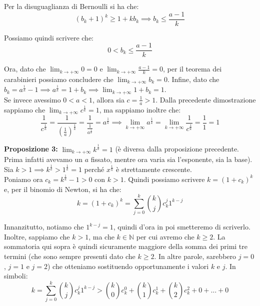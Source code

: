 \documentclass{article}
\begin{document}
\noindent Per la disuguaglianza di Bernoulli si ha che:
\begin{equation*}
    (b_k + 1)^k \geq 1 + kb_k \implies b_k \leq \frac{a - 1}{k}
\end{equation*}

\noindent Possiamo quindi scrivere che:
\begin{equation*}
    0 < b_k \leq \frac{a - 1}{k}
\end{equation*}

\noindent Ora, dato che $\lim_{k \to +\infty} 0 = 0$ e $\lim_{k \to +\infty} \frac{a - 1}{k} = 0$, per il teorema dei carabinieri possiamo concludere che $\lim_{k \to +\infty} b_k = 0$. Infine, dato che $b_k = a^\frac{1}{k} - 1 \implies a^\frac{1}{k} = 1 + b_k \implies \lim_{k \to +\infty} 1 + b_k = 1$.\\
Se invece avessimo $0 < a < 1$, allora sia $c = \frac{1}{a} > 1$. Dalla precedente dimostrazione sappiamo che $\lim_{k \to +\infty} c^\frac{1}{k} = 1$, ma sappiamo inoltre che:
\begin{equation*}
    \frac{1}{c^\frac{1}{k}} = \frac{1}{(\frac{1}{a})^\frac{1}{k}} = \frac{1}{\frac{1}{a^\frac{1}{k}}} = a^\frac{1}{k} \implies \lim_{k \to +\infty} a^\frac{1}{k} = \lim_{k \to +\infty} \frac{1}{c^\frac{1}{k}} = \frac{1}{1} = 1
\end{equation*}

\noindent\textbf{Proposizione 3:} $\lim_{k \to +\infty} k^\frac{1}{k} = 1$ (è diversa dalla proposizione precedente. Prima infatti avevamo un $a$ fissato, mentre ora varia sia l'esponente, sia la base).\\
Sia $k > 1 \implies k^\frac{1}{k} > 1^\frac{1}{k} = 1$ perché $x^\frac{1}{k}$ è strettamente crescente.\\
Poniamo ora $c_k = k^\frac{1}{k} - 1 > 0$ con $k > 1$. Quindi possiamo scrivere $k = (1 + c_k)^k$ e, per il binomio di Newton, si ha che:
\begin{equation*}
    k = (1 + c_k)^k = \sum_{j = 0}^k \binom{k}{j}c_k^j 1^{k - j}
\end{equation*}

\noindent Innanzitutto, notiamo che $1^{k - j} = 1$, quindi d'ora in poi smetteremo di scriverlo. Inoltre, sappiamo che $k > 1$, ma che $k \in \mathbb{N}$ per cui avremo che $k \geq 2$. La sommatoria qui sopra è quindi sicuramente maggiore della somma dei primi tre termini (che sono sempre presenti dato che $k \geq 2$. In altre parole, sarebbero $j = 0$, $j = 1$ e $j = 2$) che otteniamo sostituendo opportunamente i valori $k$ e $j$. In simboli:
\begin{equation*}
    k = \sum_{j = 0}^k \binom{k}{j}c_k^j 1^{k - j} > \binom{k}{0}c_k^0 + \binom{k}{1}c_k^1 + \binom{k}{2}c_k^2 + 0 + ... + 0
\end{equation*}
\end{document}
